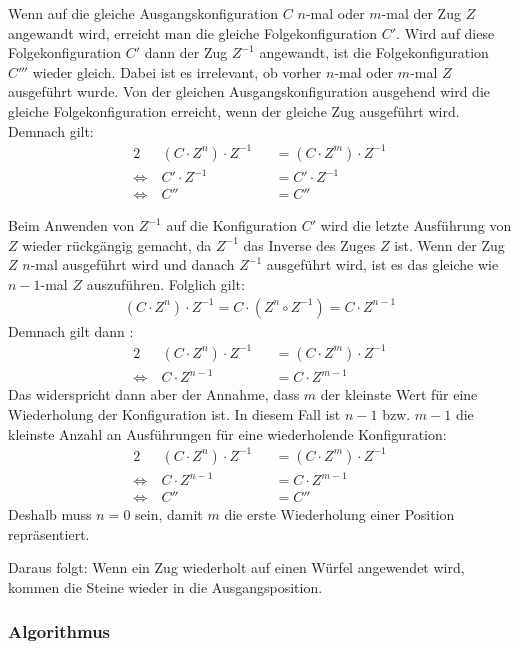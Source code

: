 \documentclass[12pt,a4paper, usenames, dvipsnames]{article}
\theoremstyle{mystyle}
\theoremstyle{definition}
\begin{document}
Wenn auf die gleiche Ausgangskonfiguration $C$ $n$-mal oder $m$-mal der Zug $Z$ angewandt wird, erreicht man die gleiche Folgekonfiguration $C'$.
Wird auf diese Folgekonfiguration $C'$ dann der Zug $Z^{-1}$ angewandt, ist die Folgekonfiguration $C'''$ wieder gleich. Dabei ist es irrelevant, ob vorher $n$-mal oder $m$-mal $Z$ ausgeführt wurde. Von der gleichen Ausgangskonfiguration ausgehend wird die gleiche Folgekonfiguration erreicht, wenn der gleiche Zug ausgeführt wird. Demnach gilt:
\begin{alignat*}{2}
\ &(C \cdot Z^n) \cdot Z^{-1} && = (C \cdot Z^m) \cdot Z^{-1}  \\
\Leftrightarrow \ & C' \cdot Z^{-1} && = C' \cdot Z^{-1} \\
\Leftrightarrow \ & C'' && = C ''
\end{alignat*}


Beim Anwenden von $Z^{-1}$ auf die Konfiguration $C'$ wird die letzte Ausführung von $Z$ wieder rückgängig gemacht, da $Z^{-1}$ das Inverse des Zuges $Z$ ist. Wenn der Zug $Z$ $n$-mal ausgeführt wird und danach $Z^{-1}$ ausgeführt wird, ist es das gleiche wie $n-1$-mal $Z$ auszuführen. Folglich gilt:
\begin{align*} 
(C \cdot Z^n) \cdot Z^{-1}=C \cdot (Z^n \circ Z^{-1})=C \cdot Z^{n-1}
\end{align*}
Demnach gilt dann :
\begin{alignat*}{2}
 & (C \cdot Z^n) \cdot Z^{-1} && = (C \cdot Z^m) \cdot Z^{-1}  \\
\Leftrightarrow \ &  C \cdot Z^{n-1} && = C \cdot Z^{m-1}
\end{alignat*}
Das widerspricht dann aber der Annahme, dass $m$ der kleinste Wert für eine Wiederholung der Konfiguration ist. In diesem Fall ist $n-1$ bzw. $m-1$ die kleinste Anzahl an Ausführungen für eine wiederholende Konfiguration:
\begin{alignat*}{2}
 & (C \cdot Z^n) \cdot Z^{-1} && = (C \cdot Z^m) \cdot Z^{-1} \\
\Leftrightarrow \ & C \cdot Z^{n-1} && = C \cdot Z^{m-1} \\
\Leftrightarrow \ & C'' && = C''
\end{alignat*}
Deshalb muss $n=0$ sein, damit $m$ die erste Wiederholung einer Position repräsentiert. 

Daraus folgt: Wenn ein Zug wiederholt auf einen Würfel angewendet wird, kommen die Steine wieder in die Ausgangsposition.

\subsubsection*{Algorithmus}
\end{document}
